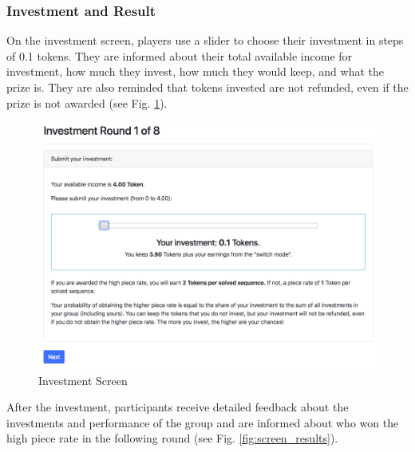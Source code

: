     \vspace{-2mm}
    
    \subsubsection{Investment and Result}
    
    On the investment screen, players use a slider to choose their investment in steps of 0.1 tokens. They are informed about their total available income for investment, how much they invest, how much they would keep, and what the prize is. They are also reminded that tokens invested are not refunded, even if the prize is not awarded (see Fig. \ref{fig:screen_invest}).\\
    
    \begin{figure}[h!]
        \centering
        \includegraphics[scale = 0.4]{graphs/screen_invest.png}
        \caption{Investment Screen}
        \label{fig:screen_invest}
    \end{figure}
    
    After the investment, participants receive detailed feedback about the investments and performance of the group and are informed about who won the high piece rate in the following round (see Fig. \ref{fig:screen_results}).
    
